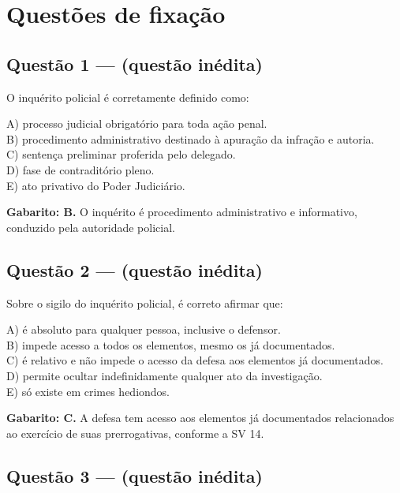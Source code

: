 \documentclass[11pt,a4paper]{article}
\begin{document}
\section*{Questões de fixação}

\subsection*{Questão 1 — (questão inédita)}

O inquérito policial é corretamente definido como:

A) processo judicial obrigatório para toda ação penal. \\ B) procedimento administrativo destinado à apuração da infração e autoria. \\ C) sentença preliminar proferida pelo delegado. \\ D) fase de contraditório pleno. \\ E) ato privativo do Poder Judiciário.

\begin{alerta}
\textbf{Gabarito: B.} O inquérito é procedimento administrativo e informativo, conduzido pela autoridade policial.
\end{alerta}

\subsection*{Questão 2 — (questão inédita)}

Sobre o sigilo do inquérito policial, é correto afirmar que:

A) é absoluto para qualquer pessoa, inclusive o defensor. \\ B) impede acesso a todos os elementos, mesmo os já documentados. \\ C) é relativo e não impede o acesso da defesa aos elementos já documentados. \\ D) permite ocultar indefinidamente qualquer ato da investigação. \\ E) só existe em crimes hediondos.

\begin{alerta}
\textbf{Gabarito: C.} A defesa tem acesso aos elementos já documentados relacionados ao exercício de suas prerrogativas, conforme a SV 14.
\end{alerta}

\subsection*{Questão 3 — (questão inédita)}
\end{document}
